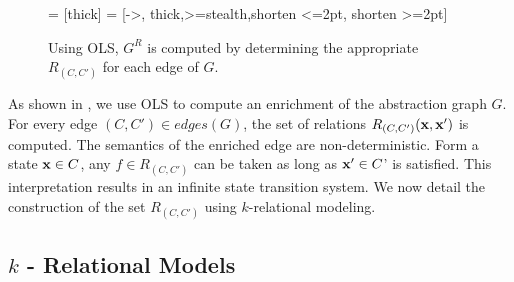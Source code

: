 \begin{figure}[!htbp]
\begin{center}
 = [thick]
 = [->, thick,>=stealth,shorten <=2pt, shorten >=2pt]
\end{center}
\vspace*{-.3cm}
\caption{Using OLS, $G^R$ is computed by determining the appropriate
$R_{(C,C')}$ for each edge of $G$.}
\label{fig:enrichment}
\vspace*{-.3cm}
\end{figure}

As shown in , we use OLS to compute an enrichment
of the abstraction graph $G$. For every edge $(C,C') \in edges(G)$,
the set of relations $R_{(C,C')}(\mathbf{x},\mathbf{x}')$ is computed. The semantics
of the enriched edge are non-deterministic. Form a state $\mathbf{x}
\in C$, any $f\in R_{(C,C')}$ can be taken as long as $\mathbf{x}' \in C$'
is satisfied. This interpretation results in an infinite state
transition system. We now detail the construction of the set
$R_{(C,C')}$ using $k$-relational modeling.



\subsection{$k$ - Relational Models}

